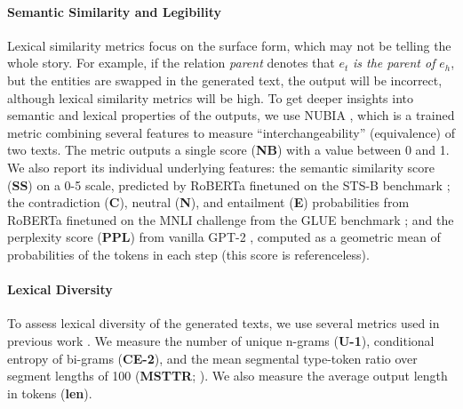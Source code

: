 \paragraph{Semantic Similarity and Legibility} Lexical similarity metrics focus on the surface form, which may not be telling the whole story. For example, if the relation \mbox{\textit{parent}} denotes that $e_t$ \textit{is the parent of} $e_h$, but the entities are swapped in the generated text, the output will be incorrect, although lexical similarity metrics will be high. To get deeper insights into semantic and lexical properties of the outputs, we use NUBIA \cite{kane2020nubia}, which is a trained metric combining several features to measure ``interchangeability'' (equivalence) of two texts. The metric outputs a single score (\textbf{NB}) with a value between 0 and 1. We also report its individual underlying features:
the semantic similarity score (\textbf{SS}) on a 0-5 scale, predicted by RoBERTa \cite{liu2019roberta} finetuned on the STS-B benchmark \cite{cer-etal-2017-semeval}; the contradiction (\textbf{C}), neutral (\textbf{N}), and entailment (\textbf{E}) probabilities from RoBERTa finetuned on the MNLI challenge from the GLUE benchmark \cite{wang2018glue}; and the perplexity score (\textbf{PPL}) from vanilla GPT-2 \cite{radford2019language}, computed as a geometric mean of probabilities of the tokens in each step (this score is referenceless).


\paragraph{Lexical Diversity} To assess lexical diversity of the generated texts, we use several metrics used in previous work \cite{duvsek2020evaluating_challenge,van2018measuring}. We measure the number of unique n-grams (\textbf{U-1}), conditional entropy of bi-grams (\textbf{CE-2}), and the mean segmental type-token ratio over segment lengths of 100 (\textbf{MSTTR}; \citealp{johnson1944studies}). We also measure the average output length in tokens (\textbf{len}).

